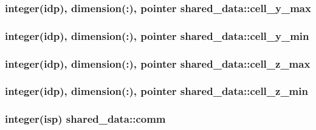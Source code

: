 \subsubsection[{\texorpdfstring{cell\+\_\+y\+\_\+max}{cell_y_max}}]{\setlength{\rightskip}{0pt plus 5cm}integer(idp), dimension(\+:), pointer shared\+\_\+data\+::cell\+\_\+y\+\_\+max}\hypertarget{namespaceshared__data_af3b3d41c5b4d46127faa634d5ad58df2}{}\label{namespaceshared__data_af3b3d41c5b4d46127faa634d5ad58df2}
\subsubsection[{\texorpdfstring{cell\+\_\+y\+\_\+min}{cell_y_min}}]{\setlength{\rightskip}{0pt plus 5cm}integer(idp), dimension(\+:), pointer shared\+\_\+data\+::cell\+\_\+y\+\_\+min}\hypertarget{namespaceshared__data_ae56bf14b4506902ecafbf55e116d20ce}{}\label{namespaceshared__data_ae56bf14b4506902ecafbf55e116d20ce}
\subsubsection[{\texorpdfstring{cell\+\_\+z\+\_\+max}{cell_z_max}}]{\setlength{\rightskip}{0pt plus 5cm}integer(idp), dimension(\+:), pointer shared\+\_\+data\+::cell\+\_\+z\+\_\+max}\hypertarget{namespaceshared__data_a77325d94a7eab8f2fd6f3ff431d9a2a3}{}\label{namespaceshared__data_a77325d94a7eab8f2fd6f3ff431d9a2a3}
\subsubsection[{\texorpdfstring{cell\+\_\+z\+\_\+min}{cell_z_min}}]{\setlength{\rightskip}{0pt plus 5cm}integer(idp), dimension(\+:), pointer shared\+\_\+data\+::cell\+\_\+z\+\_\+min}\hypertarget{namespaceshared__data_afecb94589cd67cd5d41a3fedbda6f373}{}\label{namespaceshared__data_afecb94589cd67cd5d41a3fedbda6f373}
\subsubsection[{\texorpdfstring{comm}{comm}}]{\setlength{\rightskip}{0pt plus 5cm}integer(isp) shared\+\_\+data\+::comm}\hypertarget{namespaceshared__data_a7487068a99e504a127a343402734b57b}{}\label{namespaceshared__data_a7487068a99e504a127a343402734b57b}
